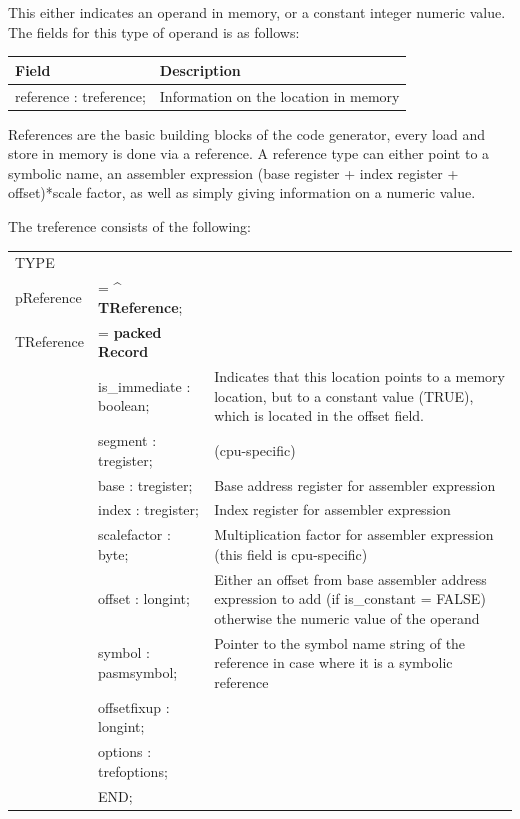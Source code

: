 \documentclass [12pt]{article}
\begin{document}
This either indicates an operand in memory, or a constant integer numeric 
value. The fields for this type of operand is as follows:

\begin{longtable}{|l|p{10cm}|}
\hline
Field   & Description \\
\hline
\endhead
\hline
\endfoot
\textsf{reference : treference;}& 
    Information on the location in memory
\end{longtable}

References are the basic building blocks of the code generator, every load 
and store in memory is done via a reference. A reference type can either 
point to a symbolic name, an assembler expression (base register + index 
register + offset)*scale factor, as well as simply giving information on a 
numeric value.

The treference consists of the following:

\begin{tabular*}{6.5in}{|l@{\extracolsep{\fill}}lp{}|}
\hline
\textsf{TYPE} & & \\
\xspace \textsf{pReference} &= \^{} \textbf{TReference};&  \\
\xspace \textsf{TReference} &= \textbf{packed Record} & \\
&\textsf{is{\_}immediate : boolean;}& 
    Indicates that this location points to a memory location, but to a
    constant value (TRUE), which is located in the offset field. \\
&\textsf{segment : tregister;}& (cpu-specific) \\
&\textsf{base : tregister;}& 
    Base address register for assembler expression \\
&\textsf{index : tregister;}& 
    Index register for assembler expression \\
&\textsf{scalefactor : byte;}& 
    Multiplication factor for assembler expression (this field is
    cpu-specific) \\
&\textsf{offset : longint;}& 
    Either an offset from base assembler address expression to add (if
    is{\_}constant = FALSE) otherwise the numeric value of the operand \\
&\textsf{symbol : pasmsymbol;}& 
    Pointer to the symbol name string of the reference in case where it is
    a symbolic reference \\
&\textsf{offsetfixup : longint;}&  \\
&\textsf{options : trefoptions;}&  \\
&\textsf{END;}&  \\
\hline
\end{tabular*}
\end{document}
